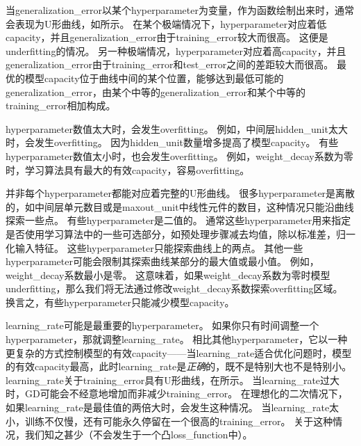 当\gls{generalization_error}以某个\gls{hyperparameter}为变量，作为函数绘制出来时，通常会表现为U形曲线，如所示。
在某个极端情况下，\gls{hyperparameter}对应着低\gls{capacity}，并且\gls{generalization_error}由于\gls{training_error}较大而很高。
这便是\gls{underfitting}的情况。
另一种极端情况，\gls{hyperparameter}对应着高\gls{capacity}，并且\gls{generalization_error}由于\gls{training_error}和\gls{test_error}之间的差距较大而很高。
最优的模型\gls{capacity}位于曲线中间的某个位置，能够达到最低可能的\gls{generalization_error}，由某个中等的\gls{generalization_error}和某个中等的\gls{training_error}相加构成。



\gls{hyperparameter}数值太大时，会发生\gls{overfitting}。
例如，中间层\gls{hidden_unit}太大时，会发生\gls{overfitting}。%
因为\gls{hidden_unit}数量增多提高了模型\gls{capacity}。
有些\gls{hyperparameter}数值太小时，也会发生\gls{overfitting}。
例如，\gls{weight_decay}系数为零时，学习算法具有最大的有效\gls{capacity}，容易\gls{overfitting}。%


并非每个\gls{hyperparameter}都能对应着完整的U形曲线。
很多\gls{hyperparameter}是离散的，如中间层单元数目或是\gls{maxout_unit}中线性元件的数目，这种情况只能沿曲线探索一些点。
有些\gls{hyperparameter}是二值的。
通常这些\gls{hyperparameter}用来指定是否使用学习算法中的一些可选部分，如预处理步骤减去均值，除以标准差，归一化输入特征。
这些\gls{hyperparameter}只能探索曲线上的两点。
其他一些\gls{hyperparameter}可能会限制其探索曲线某部分的最大值或最小值。%
例如，\gls{weight_decay}系数最小是零。
这意味着，如果\gls{weight_decay}系数为零时模型\gls{underfitting}，那么我们将无法通过修改\gls{weight_decay}系数探索\gls{overfitting}区域。
换言之，有些\gls{hyperparameter}只能减少模型\gls{capacity}。


\gls{learning_rate}可能是最重要的\gls{hyperparameter}。
如果你只有时间调整一个\gls{hyperparameter}，那就调整\gls{learning_rate}。
相比其他\gls{hyperparameter}，它以一种更复杂的方式控制模型的有效\gls{capacity}——当\gls{learning_rate}适合优化问题时，模型的有效\gls{capacity}最高，此时\gls{learning_rate}是\emph{正确}的，既不是特别大也不是特别小。
\gls{learning_rate}关于\gls{training_error}具有U形曲线，在所示。
当\gls{learning_rate}过大时，\gls{GD}可能会不经意地增加而非减少\gls{training_error}。
在理想化的二次情况下，如果\gls{learning_rate}是最佳值的两倍大时，会发生这种情况\citep{LeCun+98backprop-small}。
当\gls{learning_rate}太小，训练不仅慢，还有可能永久停留在一个很高的\gls{training_error}。
关于这种情况，我们知之甚少（不会发生于一个凸\gls{loss_function}中）。

